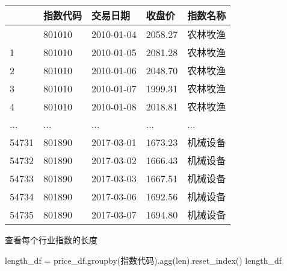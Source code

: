 \documentclass[
  letterpaper,
  DIV=11,
  numbers=noendperiod]{scrreprt}
\newenvironment{Shaded}{\begin{snugshade}}{\end{snugshade}}
\newcommand{\BuiltInTok}[1]{\textcolor[rgb]{0.00,0.23,0.31}{#1}}
\newcommand{\NormalTok}[1]{\textcolor[rgb]{0.00,0.23,0.31}{#1}}
\newcommand{\OperatorTok}[1]{\textcolor[rgb]{0.37,0.37,0.37}{#1}}
\newcommand{\StringTok}[1]{\textcolor[rgb]{0.13,0.47,0.30}{#1}}
\begin{document}
\begin{longtable}[]{@{}lllll@{}}
\toprule\noalign{}
& 指数代码 & 交易日期 & 收盘价 & 指数名称 \\
\midrule\noalign{}
\endhead
\bottomrule\noalign{}
\endlastfoot
0 & 801010 & 2010-01-04 & 2058.27 & 农林牧渔 \\
1 & 801010 & 2010-01-05 & 2081.28 & 农林牧渔 \\
2 & 801010 & 2010-01-06 & 2048.70 & 农林牧渔 \\
3 & 801010 & 2010-01-07 & 1999.31 & 农林牧渔 \\
4 & 801010 & 2010-01-08 & 2018.81 & 农林牧渔 \\
... & ... & ... & ... & ... \\
54731 & 801890 & 2017-03-01 & 1673.23 & 机械设备 \\
54732 & 801890 & 2017-03-02 & 1666.43 & 机械设备 \\
54733 & 801890 & 2017-03-03 & 1667.51 & 机械设备 \\
54734 & 801890 & 2017-03-06 & 1692.56 & 机械设备 \\
54735 & 801890 & 2017-03-07 & 1694.80 & 机械设备 \\
\end{longtable}

查看每个行业指数的长度

\begin{Shaded}
\begin{Highlighting}[]
\NormalTok{length\_df }\OperatorTok{=}\NormalTok{ price\_df.groupby(}\StringTok{\textquotesingle{}指数代码\textquotesingle{}}\NormalTok{).agg(}\BuiltInTok{len}\NormalTok{).reset\_index()}
\NormalTok{length\_df}
\end{Highlighting}
\end{Shaded}
\end{document}
